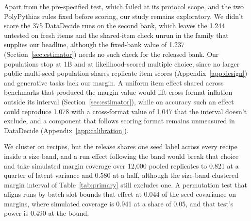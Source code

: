 Apart from the pre-specified test, which failed at its protocol scope, and the two PolyPythias rules fixed before scoring, our study remains exploratory. We didn't score the 375 DataDecide runs on the second bank, which leaves the 1.244 untested on fresh items and the shared-item check unrun in the family that supplies our headline, although the fixed-bank value of 1.237 (Section~\ref{sec:estimator}) needs no such check for the released bank. Our populations stop at 1B and at likelihood-scored multiple choice, since no larger public multi-seed population shares replicate item scores (Appendix~\ref{app:design}) and generative tasks lack our margin. A uniform item effect shared across benchmarks that produced the margin value would lift cross-format inflation outside its interval (Section~\ref{sec:estimator}), while on accuracy such an effect could reproduce 1.078 with a cross-format value of 1.047 that the interval  doesn't exclude, and a component that follows scoring format remains unmeasured in DataDecide (Appendix~\ref{app:calibration}).

We cluster on recipes, but the release shares one seed label across every recipe inside a size band, and a run effect following the band would break that choice and take simulated margin coverage over 12,000 pooled replicates to 0.821 at a quarter of latent variance and 0.580 at a half, although the size-band-clustered margin interval  of Table~\ref{tab:primary} still excludes one. A permutation test that aligns runs by batch slot bounds that effect at 0.044 of the seed covariance on margins, where simulated coverage is 0.941 at a share of 0.05, and that test's power is 0.490 at the bound.

